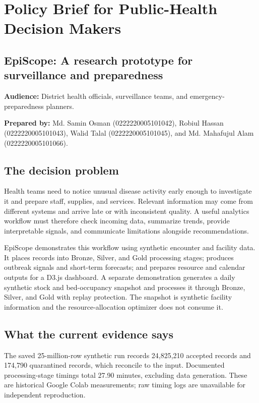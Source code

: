 \documentclass[11pt,a4paper]{article}
\begin{document}
\clearpage
\section*{Policy Brief for Public-Health Decision Makers}
\subsection*{EpiScope: A research prototype for surveillance and preparedness}

\noindent\textbf{Audience:} District health officials, surveillance teams, and emergency-preparedness planners.

\noindent\textbf{Prepared by:} Md. Samin Osman (0222220005101042), Robiul Hassan (0222220005101043), Walid Talal (0222220005101045), and Md. Mahafujul Alam (0222220005101066).

\subsection*{The decision problem}
Health teams need to notice unusual disease activity early enough to investigate it and prepare staff, supplies, and services. Relevant information may come from different systems and arrive late or with inconsistent quality. A useful analytics workflow must therefore check incoming data, summarize trends, provide interpretable signals, and communicate limitations alongside recommendations.

EpiScope demonstrates this workflow using synthetic encounter and facility data. It places records into Bronze, Silver, and Gold processing stages; produces outbreak signals and short-term forecasts; and prepares resource and calendar outputs for a D3.js dashboard. A separate demonstration generates a daily synthetic stock and bed-occupancy snapshot and processes it through Bronze, Silver, and Gold with replay protection. The snapshot is synthetic facility information and the resource-allocation optimizer does not consume it.

\subsection*{What the current evidence says}
The saved 25-million-row synthetic run records 24,825,210 accepted records and 174,790 quarantined records, which reconcile to the input. Documented processing-stage timings total 27.90 minutes, excluding data generation. These are historical Google Colab measurements; raw timing logs are unavailable for independent reproduction.
\end{document}
